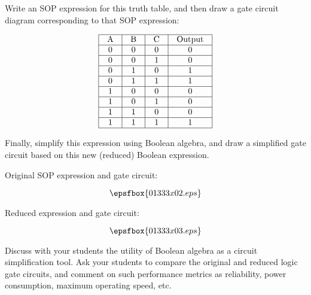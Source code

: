 

Write an SOP expression for this truth table, and then draw a gate circuit diagram corresponding to that SOP expression:



$$\vbox{\offinterlineskip
\halign{\strut
\vrule \quad\hfil # \ \hfil & 
\vrule \quad\hfil # \ \hfil & 
\vrule \quad\hfil # \ \hfil & 
\vrule \quad\hfil # \ \hfil \vrule \cr
\noalign{\hrule}
%
A & B & C & Output \cr
%
\noalign{\hrule}
%
0 & 0 & 0 & 0 \cr
%
\noalign{\hrule}
%
0 & 0 & 1 & 0 \cr
%
\noalign{\hrule}
%
0 & 1 & 0 & 1 \cr
%
\noalign{\hrule}
%
0 & 1 & 1 & 1 \cr
%
\noalign{\hrule}
%
1 & 0 & 0 & 0 \cr
%
\noalign{\hrule}
%
1 & 0 & 1 & 0 \cr
%
\noalign{\hrule}
%
1 & 1 & 0 & 0 \cr
%
\noalign{\hrule}
%
1 & 1 & 1 & 1 \cr
%
\noalign{\hrule}
} %
}$$ %

Finally, simplify this expression using Boolean algebra, and draw a simplified gate circuit based on this new (reduced) Boolean expression.







Original SOP expression and gate circuit:

$$\epsfbox{01333x02.eps}$$

\vskip 10pt

Reduced expression and gate circuit:

$$\epsfbox{01333x03.eps}$$







Discuss with your students the utility of Boolean algebra as a circuit simplification tool.  Ask your students to compare the original and reduced logic gate circuits, and comment on such performance metrics as reliability, power consumption, maximum operating speed, etc.




